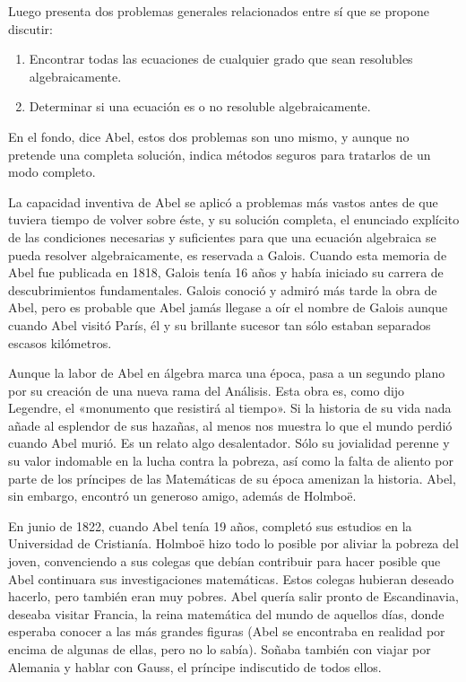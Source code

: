 \documentclass[a4paper, 12pt, draft]{article}
\begin{document}
Luego presenta dos problemas generales relacionados entre sí que se propone discutir:

\begin{enumerate}
\vspace{-1em}

   \item  Encontrar todas las ecuaciones de cualquier grado que sean resolubles algebraicamente.
   
   \item Determinar si una ecuación es o no resoluble algebraicamente.

\end{enumerate}

En el fondo, dice Abel, estos dos problemas son uno mismo, y aunque no pretende una completa solución, indica métodos seguros  para tratarlos de un modo completo.

La capacidad inventiva de Abel se aplicó a problemas más vastos antes de que tuviera tiempo de volver sobre éste, y su solución completa, el enunciado explícito de las condiciones necesarias y suficientes para que una ecuación algebraica se pueda resolver algebraicamente, es reservada a Galois. Cuando esta memoria de Abel fue publicada en 1818, Galois tenía 16 años y había iniciado su carrera de descubrimientos fundamentales. Galois conoció y admiró más tarde la obra de Abel, pero es probable que Abel jamás llegase a oír el nombre de Galois aunque cuando Abel visitó París, él y su brillante sucesor tan sólo estaban separados escasos kilómetros.

Aunque la labor de Abel en álgebra marca una época, pasa a un segundo plano por su creación de una nueva rama del Análisis. Esta obra es, como dijo Legendre, el «monumento que resistirá al tiempo». Si la historia de su vida nada añade al esplendor de sus hazañas, al menos nos muestra lo que el mundo perdió cuando Abel murió. Es un relato algo desalentador. Sólo su jovialidad perenne y su valor indomable en la lucha contra la pobreza, así como la falta de aliento por parte de los príncipes de las Matemáticas de su época amenizan la historia. Abel, sin embargo, encontró un generoso amigo, además de Holmboë.

En junio de 1822, cuando Abel tenía 19 años, completó sus estudios en la Universidad de Cristianía. Holmboë hizo todo lo posible por aliviar la pobreza del joven, convenciendo a sus colegas que debían contribuir para hacer posible que Abel continuara sus investigaciones matemáticas. Estos colegas hubieran deseado hacerlo, pero también eran muy pobres. Abel quería salir pronto de Escandinavia, deseaba visitar Francia, la reina matemática del mundo de aquellos días, donde esperaba conocer a las más grandes figuras (Abel se encontraba en realidad por encima de algunas de ellas, pero no lo sabía). Soñaba también con viajar por Alemania y hablar con Gauss, el príncipe indiscutido de todos ellos.
\end{document}
